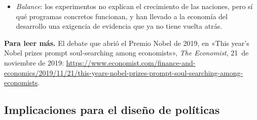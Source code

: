 \documentclass[11pt]{article}
\begin{document}
\begin{itemize}
\begin{itemize}
  \item \emph{la ética}: se experimenta con personas muy pobres, y quien queda en el grupo de control se queda sin un programa que puede ser bueno\nocite{Deaton2020}.
  \end{itemize}
\item \emph{Balance}: los experimentos no explican el crecimiento de las naciones, pero sí qué programas concretos funcionan, y han llevado a la economía del desarrollo una exigencia de evidencia que ya no tiene vuelta atrás.
\end{itemize}

\begin{anotaciones}
\textbf{Para leer más.} El debate que abrió el Premio Nobel de 2019, en «This year's Nobel prizes prompt soul-searching among economists», \emph{The Economist}, 21~de noviembre de 2019: \url{https://www.economist.com/finance-and-economics/2019/11/21/this-years-nobel-prizes-prompt-soul-searching-among-economists}\nocite{Economist2019Nobel}.
\end{anotaciones}

\subsection{Implicaciones para el diseño de políticas}\label{sec:politicas}
\end{document}
